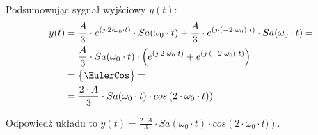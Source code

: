 \begin{task}
Podsumowując sygnał wyjściowy $y(t)$:
\begin{align*}
y(t) &= \frac{A}{3} \cdot e^{(\jmath \cdot 2 \cdot \omega_0 \cdot t)} \cdot Sa(\omega_0 \cdot t) + \frac{A}{3} \cdot e^{(\jmath \cdot (-2 \cdot \omega_0) \cdot t)} \cdot Sa(\omega_0 \cdot t)=\\
&= \frac{A}{3} \cdot Sa(\omega_0 \cdot t) \cdot \left(e^{(\jmath \cdot 2 \cdot \omega_0 \cdot t)} + e^{(\jmath \cdot (-2 \cdot \omega_0) \cdot t)} \right)=\\
&=\begin{Bmatrix}
\EulerCos
\end{Bmatrix}=\\
&= \frac{2 \cdot A}{3} \cdot Sa(\omega_0 \cdot t) \cdot cos\left(2 \cdot \omega_0 \cdot t)\right)
\end{align*}

Odpowied\'{z} układu to $y(t)= \frac{2 \cdot A}{3} \cdot Sa(\omega_0 \cdot t) \cdot cos\left(2 \cdot \omega_0 \cdot t)\right)$.
\end{task}


